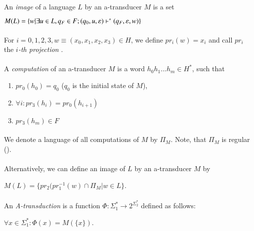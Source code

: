 \paragraph{}
 An \emph{image} of a language $L$ by an a-transducer $M$ is a set \\
\centerline{$M(L) = \{ w|\exists u \in L, q_{F} \in F; (q_{0}, u, \varepsilon) \vdash^\ast (q_{F}, \varepsilon, w) \} $}

\paragraph{}
 For $i=0,1,2,3, w \equiv (x_{0},x_{1},x_{2},x_{3}) \in H$, we define $pr_{i}(w) = x_{i}$ and call $pr_{i}$ the \emph{$i$-th projection} .

\paragraph{}
 A \emph{computation} of an a-transducer $M$ is a word $h_{0}h_{1}...h_{m} \in H^{*}$, such that
\begin{enumerate}
\item $pr_{0}(h_{0}) = q_{0}$ ($q_{0}$ is the initial state of $M$),
\item $\forall i: pr_{3}(h_{i}) = pr_{0}(h_{i+1})$
\item $pr_{3}(h_{m}) \in F$
\end{enumerate}

\paragraph{}
\oznacenie We denote a language of all computations of $M$ by $\Pi_{M}$. Note, that $\Pi_{M}$ is regular (\cite{gin:AATPFL}).

\paragraph{}
 Alternatively, we can define an image of $L$ by an a-transducer $M$ by \\
\centerline{$M(L) = \{ pr_{2}(pr_{1}^{-1}(w) \cap \Pi_{M} | w \in L \}$.}

\paragraph{}
 An \emph{A-transduction} is a function $\Phi : \Sigma_{1}^{*} \rightarrow 2^{\Sigma_{2}^{*}}$ defined as follows: \\
\centerline{$\forall x \in \Sigma_{1}^{*}: \Phi(x) = M(\{ x\}) $.}

